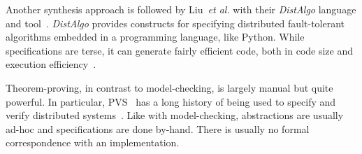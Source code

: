 Another synthesis approach is followed by Liu~\emph{et al.} with their
\emph{DistAlgo} language and tool~\cite{distalgo,distalgo2}. \emph{DistAlgo}
provides constructs for specifying distributed fault-tolerant algorithms
embedded in a programming language, like Python. While specifications are terse,
it can generate fairly efficient code, both in code size and execution
efficiency~\cite{distalgo2}.

Theorem-proving, in contrast to model-checking, is largely manual but quite
powerful. In particular, PVS~\cite{pvs} has a long history of being used to
specify and verify distributed systems~\cite{unified,fmcad07}. Like with
model-checking, abstractions are usually ad-hoc and specifications are done
by-hand. There is usually no formal correspondence with an implementation.
